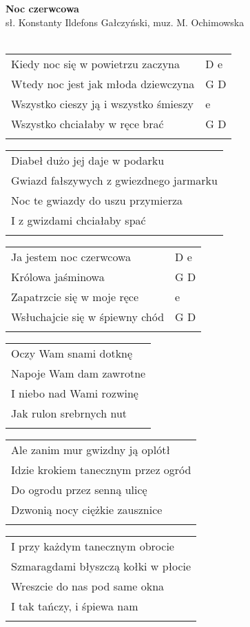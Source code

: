 \documentclass[a5paper]{article}
\begin{document}


\noindent
\fontsize{12pt}{15pt}\selectfont
\textbf{Noc czerwcowa} \\
\fontsize{8pt}{10pt}\selectfont
sł. Konstanty Ildefons Gałczyński, muz. M. Ochimowska \\ \\
\fontsize{10pt}{12pt}\selectfont
{}
\begin{tabular}{@{}p{7.50cm}p{3cm}@{}}
\noindent
Kiedy noc się w powietrzu zaczyna & D e \\
Wtedy noc jest jak młoda dziewczyna & G D \\
Wszystko cieszy ją i wszystko śmieszy & e \\
Wszystko chciałaby w ręce brać & G D \\ \\
\end{tabular}

\noindent
\begin{tabular}{@{}p{7.50cm}@{}}
Diabeł dużo jej daje w podarku \\
Gwiazd fałszywych z gwiezdnego jarmarku \\
Noc te gwiazdy do uszu przymierza \\
I z gwizdami chciałaby spać \\ \\
\end{tabular}

\noindent
\begin{tabular}{@{}p{6.50cm}p{3cm}@{}}
Ja jestem noc czerwcowa & D e \\
Królowa jaśminowa & G D \\
Zapatrzcie się w moje ręce & e \\
Wsłuchajcie się w śpiewny chód & G D \\ \\
\end{tabular}

\noindent
\begin{tabular}{@{}p{7.50cm}@{}}
Oczy Wam snami dotknę \\
Napoje Wam dam zawrotne \\
I niebo nad Wami rozwinę \\
Jak rulon srebrnych nut \\ \\
\end{tabular}

\noindent
\begin{tabular}{@{}p{7.50cm}@{}}
Ale zanim mur gwizdny ją oplótł \\
Idzie krokiem tanecznym przez ogród \\
Do ogrodu przez senną ulicę \\
Dzwonią nocy ciężkie zausznice \\ \\
\end{tabular}

\noindent
\begin{tabular}{@{}p{7.50cm}@{}}
I przy każdym tanecznym obrocie \\
Szmaragdami błyszczą kołki w płocie \\
Wreszcie do nas pod same okna \\
I tak tańczy, i śpiewa nam \\ \\
\end{tabular}
\end{document}
